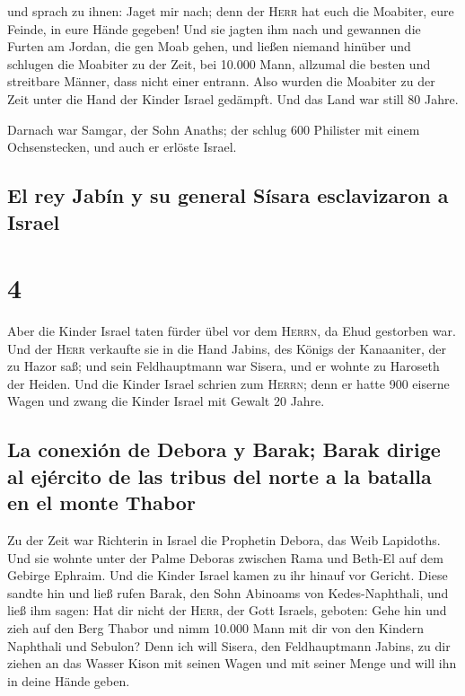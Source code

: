  und sprach zu ihnen: Jaget mir nach; denn der
\textsc{Herr} hat euch die Moabiter, eure Feinde, in eure Hände gegeben!
Und sie jagten ihm nach und gewannen die Furten am Jordan, die gen Moab
gehen, und ließen niemand hinüber  und schlugen die
Moabiter zu der Zeit, bei 10.000 Mann, allzumal die besten und
streitbare Männer, dass nicht einer entrann.  Also wurden
die Moabiter zu der Zeit unter die Hand der Kinder Israel gedämpft. Und
das Land war still 80 Jahre.

 Darnach war Samgar, der Sohn Anaths; der schlug 600
Philister mit einem Ochsenstecken, und auch er erlöste Israel.

\hypertarget{el-rey-jabuxedn-y-su-general-suxedsara-esclavizaron-a-israel}{%
\subsection{El rey Jabín y su general Sísara esclavizaron a
Israel}\label{el-rey-jabuxedn-y-su-general-suxedsara-esclavizaron-a-israel}}

\hypertarget{section-3}{%
\section{4}\label{section-3}}

 Aber die Kinder Israel taten fürder übel vor dem
\textsc{Herrn}, da Ehud gestorben war.  Und der
\textsc{Herr} verkaufte sie in die Hand Jabins, des Königs der
Kanaaniter, der zu Hazor saß; und sein Feldhauptmann war Sisera, und er
wohnte zu Haroseth der Heiden.  Und die Kinder Israel
schrien zum \textsc{Herrn}; denn er hatte 900 eiserne Wagen und zwang
die Kinder Israel mit Gewalt 20 Jahre.

\hypertarget{la-conexiuxf3n-de-debora-y-barak-barak-dirige-al-ejuxe9rcito-de-las-tribus-del-norte-a-la-batalla-en-el-monte-thabor}{%
\subsection{La conexión de Debora y Barak; Barak dirige al ejército de
las tribus del norte a la batalla en el monte
Thabor}\label{la-conexiuxf3n-de-debora-y-barak-barak-dirige-al-ejuxe9rcito-de-las-tribus-del-norte-a-la-batalla-en-el-monte-thabor}}

 Zu der Zeit war Richterin in Israel die Prophetin Debora,
das Weib Lapidoths.  Und sie wohnte unter der Palme
Deboras zwischen Rama und Beth-El auf dem Gebirge Ephraim. Und die
Kinder Israel kamen zu ihr hinauf vor Gericht.  Diese
sandte hin und ließ rufen Barak, den Sohn Abinoams von Kedes-Naphthali,
und ließ ihm sagen: Hat dir nicht der \textsc{Herr}, der Gott Israels,
geboten: Gehe hin und zieh auf den Berg Thabor und nimm 10.000 Mann mit
dir von den Kindern Naphthali und Sebulon?  Denn ich will
Sisera, den Feldhauptmann Jabins, zu dir ziehen an das Wasser Kison mit
seinen Wagen und mit seiner Menge und will ihn in deine Hände geben.

